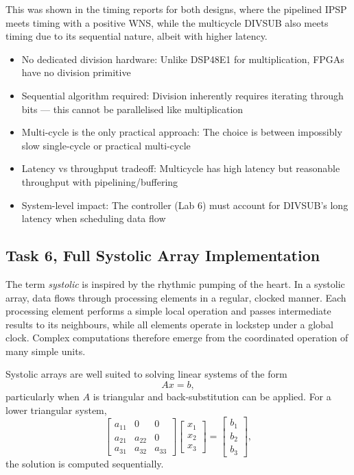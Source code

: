\documentclass[a4paper,12pt]{article}
\begin{document}
This was shown in the timing reports for both designs, where the pipelined IPSP meets timing with a positive WNS, while the multi\-cycle DIVSUB also meets timing due to its sequential nature, albeit with higher latency.

\begin{itemize}
    \item No dedicated division hardware: Unlike DSP48E1 for multiplication, FPGAs have no division primitive
    \item Sequential algorithm required: Division inherently requires iterating through bits — this cannot be parallelised like multiplication
    \item Multi-cycle is the only practical approach: The choice is between impossibly slow single-cycle or practical multi-cycle
    \item Latency vs throughput trade\-off: Multi\-cycle has high latency but reasonable throughput with pipelining/buffering
    \item System-level impact: The controller (Lab 6) must account for DIVSUB's long latency when scheduling data flow
\end{itemize}

\subsection{Task 6, Full Systolic Array Implementation}

The term \emph{systolic} is inspired by the rhythmic pumping of the heart. In a systolic array, data flows through processing elements in a regular, clocked manner. Each processing element performs a simple local operation and passes intermediate results to its neighbours, while all elements operate in lockstep under a global clock. Complex computations therefore emerge from the coordinated operation of many simple units.

Systolic arrays are well suited to solving linear systems of the form
\begin{equation}
A x = b,
\end{equation}
particularly when $A$ is triangular and back-substitution can be applied. For a lower triangular system,
\begin{equation}
\begin{bmatrix}
a_{11} & 0 & 0 \\
a_{21} & a_{22} & 0 \\
a_{31} & a_{32} & a_{33}
\end{bmatrix}
\begin{bmatrix}
x_1 \\ x_2 \\ x_3
\end{bmatrix}
=
\begin{bmatrix}
b_1 \\ b_2 \\ b_3
\end{bmatrix},
\end{equation}
the solution is computed sequentially.
\end{document}
